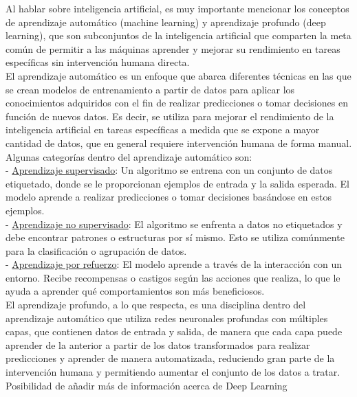 Al hablar sobre inteligencia artificial, es muy importante mencionar los conceptos de aprendizaje automático (machine learning) y aprendizaje profundo (deep learning), que son subconjuntos de la inteligencia artificial que comparten la meta común de permitir a las máquinas aprender y mejorar su rendimiento en tareas específicas sin intervención humana directa.\\
El aprendizaje automático es un enfoque que abarca diferentes técnicas en las que se crean modelos de entrenamiento a partir de datos para aplicar los conocimientos adquiridos con el fin de realizar predicciones o tomar decisiones en función de nuevos datos. Es decir, se utiliza para mejorar el rendimiento de la inteligencia artificial en tareas específicas a medida que se expone a mayor cantidad de datos, que en general requiere intervención humana de forma manual.\\

Algunas categorías dentro del aprendizaje automático son:\\
- \underline{ Aprendizaje supervisado}: Un algoritmo se entrena con un conjunto de datos etiquetado, donde se le proporcionan ejemplos de entrada y la salida esperada. El modelo aprende a realizar predicciones o tomar decisiones basándose en estos ejemplos.\\

- \underline{ Aprendizaje no supervisado}: El algoritmo se enfrenta a datos no etiquetados y debe encontrar patrones o estructuras por sí mismo. Esto se utiliza comúnmente para la clasificación o agrupación de datos.\\

- \underline{ Aprendizaje por refuerzo}: El modelo aprende a través de la interacción con un entorno. Recibe recompensas o castigos según las acciones que realiza, lo que le ayuda a aprender qué comportamientos son más beneficiosos.\\

El aprendizaje profundo, a lo que respecta, es una disciplina dentro del aprendizaje automático que utiliza redes neuronales profundas con múltiples capas, que contienen datos de entrada y salida, de manera que cada capa puede aprender de la anterior a partir de los datos transformados para realizar predicciones y aprender de manera automatizada, reduciendo gran parte de la intervención humana y permitiendo aumentar el conjunto de los datos a tratar.\\
Posibilidad de añadir más de información acerca de Deep Learning\\

